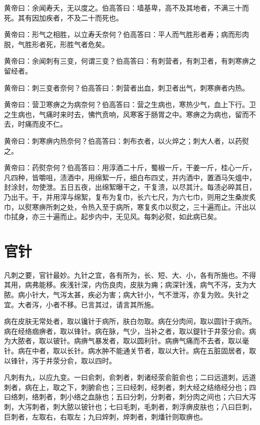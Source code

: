 \documentclass[a4paper,12pt,UTF8,twoside]{ctexbook}
\begin{document}
	黄帝曰：余闻寿夭，无以度之。伯高答曰：墙基卑，高不及其地者，不满三十而死。其有因加疾者，不及二十而死也。
	
	黄帝曰：形气之相胜，以立寿夭奈何？伯高答曰：平人而气胜形者寿；病而形肉脱，气胜形者死，形胜气者危矣。
	
	黄帝曰：余闻刺有三变，何谓三变？伯高答曰：有刺营者，有刺卫者，有刺寒痹之留经者。
	
	黄帝曰：刺三变者奈何？伯高答曰：刺营者出血，刺卫者出气，刺寒痹者内热。
	
	黄帝曰：营卫寒痹之为病奈何？伯高答曰：营之生病也，寒热少气，血上下行。卫之生病也，气痛时来时去，怫忾贲响，风寒客于肠胃之中。寒痹之为病也，留而不去，时痛而皮不仁。
	
	黄帝曰：刺寒痹内热奈何？伯高答曰：刺布衣者，以火焠之；刺大人者，以药熨之。
	
	黄帝曰：药熨奈何？伯高答曰：用淳酒二十斤，蜀椒一斤，干姜一斤，桂心一斤，凡四种，皆嚼咀，渍酒中，用绵絮一斤，细白布四丈，并内酒中，置酒马矢熅中，封涂封，勿使泄。五日五夜，出绵絮曝干之，干复溃，以尽其汁。每渍必晬其日，乃出干。干，并用滓与绵絮，复布为复巾，长六七尺，为六七巾，则用之生桑炭炙巾，以熨寒痹所刺之处，令热入至于病所，寒复炙巾以熨之，三十遍而止。汗出以巾拭身，亦三十遍而止。起步内中，无见风。每刺必熨，如此病已矣。
	
	\chapter{官针}
	
	凡刺之要，官针最妙。九针之宜，各有所为，长、短、大、小，各有所施也。不得其用，病弗能移。疾浅针深，内伤良肉，皮肤为痈；病深针浅，病气不泻，支为大脓。病小针大，气泻太甚，疾必为害；病大针小，气不泄泻，亦复为败。失针之宜。大者泻，小者不移。已言其过，请言其所施。
	
	病在皮肤无常处者，取以镵针于病所，肤白勿取。病在分肉间，取以圆针于病所。病在经络痼痹者，取以锋针。病在脉，气少，当补之者，取以鍉针于井荥分俞。病为大脓者，取以铍针。病痹气暴发者，取以圆利针。病痹气痛而不去者，取以毫针。病在中者，取以长针。病水肿不能通关节者，取以大针。病在五脏固居者，取以锋针，泻于井荥分俞，取以四时。
	
	凡刺有九，以应九变。一曰俞刺，俞刺者，刺诸经荥俞脏俞也；二曰远道刺，远道刺者，病在上，取之下，刺腑俞也；三曰经刺，经刺者，刺大经之结络经分也；四曰络刺，络刺者，刺小络之血脉也；五曰分刺，分刺者，刺分肉之间也；六曰大泻刺，大泻刺者，刺大脓以铍针也；七曰毛刺，毛刺者，刺浮痹皮肤也；八曰巨刺，巨刺者，左取右，右取左；九曰焠刺，焠刺者，刺燔针则取痹也。
	
\end{document}
